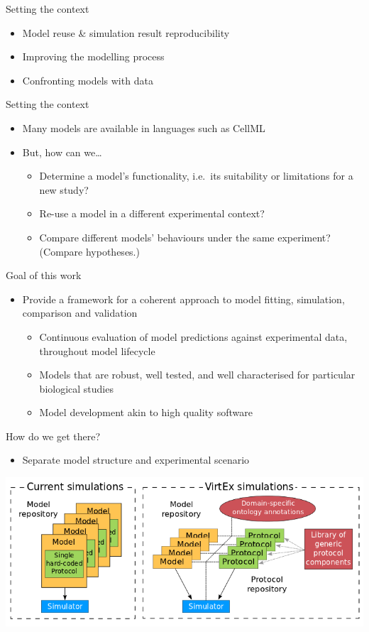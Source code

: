 \documentclass[t,xcolor={usenames,dvipsnames}]{beamer}
\newcommand{\subitem}[1]{\begin{itemize}[<.->]\item #1 \end{itemize}}
\begin{document}
\begin{frame}{Setting the context}
\begin{itemize}
\item Model reuse \& simulation result reproducibility
\item Improving the modelling process
\item Confronting models with data
\end{itemize}
\end{frame}


\begin{frame}{Setting the context}
\begin{itemize}
\item Many models are available in languages such as CellML
\item But, how can we\ldots
  \begin{itemize}
  \item Determine a model's functionality, i.e.\ its suitability or limitations for a new study?
  \item Re-use a model in a different experimental context?
  \item Compare different models' behaviours under the same experiment?  (Compare hypotheses.)
  \end{itemize}
\end{itemize}
\end{frame}


\begin{frame}{Goal of this work}
\begin{itemize}
\item Provide a framework for a coherent approach to model fitting, simulation, comparison and validation
  \begin{itemize}
  \item Continuous evaluation of model predictions against experimental data, throughout model lifecycle
  \item Models that are robust, well tested, and well characterised for particular biological studies
  \item Model development akin to high quality software
  \end{itemize}
\end{itemize}
\end{frame}


\begin{frame}{How do we get there?}
\subitem{Separate \alert{model structure} and \alert{experimental scenario}}
\begin{center}
\includegraphics[width=.9\textwidth]{VirtEx_overview}
\end{center}
\end{frame}
\end{document}
